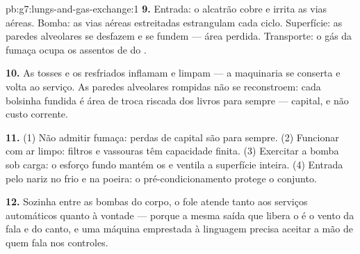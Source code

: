 \begin{solution}{pb:g7:lungs-and-gas-exchange:1}
\textbf{9.} Entrada: o alcatrão cobre e irrita as vias aéreas. Bomba:
as vias aéreas estreitadas estrangulam cada ciclo. Superfície: as
paredes alveolares se desfazem e se fundem --- área perdida.
Transporte: o gás da fumaça ocupa os assentos de  do .

\textbf{10.} As tosses e os resfriados inflamam e limpam --- a
maquinaria se conserta e volta ao serviço. As paredes alveolares
rompidas não se reconstroem: cada bolsinha fundida é área de troca
riscada dos livros para sempre --- capital, e não custo corrente.

\textbf{11.} (1) Não admitir fumaça: perdas de capital são para
sempre. (2) Funcionar com ar limpo: filtros e vassouras têm capacidade
finita. (3) Exercitar a bomba sob carga: o esforço fundo mantém os
 e ventila a superfície inteira. (4) Entrada pelo nariz no
frio e na poeira: o pré-condicionamento protege o conjunto.

\textbf{12.} Sozinha entre as bombas do corpo, o fole atende tanto aos
serviços automáticos quanto à vontade --- porque a mesma saída que
libera o  é o vento da fala e do canto, e uma máquina
emprestada à linguagem precisa aceitar a mão de quem fala nos
controles.
\end{solution}
